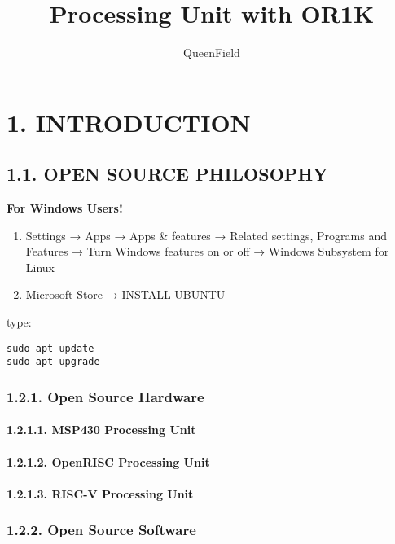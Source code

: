 \documentclass[]{article}
\title{Processing Unit with OR1K}
\author{QueenField}
\date{}
\let\oldparagraph\paragraph
\renewcommand{\paragraph}[1]{\oldparagraph{#1}\mbox{}}
\begin{document}
\maketitle

\section{1. INTRODUCTION}\label{introduction}

\subsection{1.1. OPEN SOURCE PHILOSOPHY}\label{open-source-philosophy}

\textbf{For Windows Users!}

\begin{enumerate}
\def\labelenumi{\arabic{enumi}.}
\item
  Settings → Apps → Apps \& features → Related settings, Programs and
  Features → Turn Windows features on or off → Windows Subsystem for
  Linux
\item
  Microsoft Store → INSTALL UBUNTU
\end{enumerate}

type:

\begin{verbatim}
sudo apt update
sudo apt upgrade
\end{verbatim}

\subsubsection{1.2.1. Open Source Hardware}\label{open-source-hardware}

\paragraph{1.2.1.1. MSP430 Processing
Unit}\label{msp430-processing-unit}

\paragraph{1.2.1.2. OpenRISC Processing
Unit}\label{openrisc-processing-unit}

\paragraph{1.2.1.3. RISC-V Processing
Unit}\label{risc-v-processing-unit}

\subsubsection{1.2.2. Open Source Software}\label{open-source-software}
\end{document}
